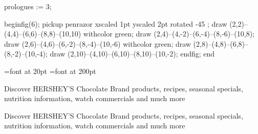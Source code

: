 \documentclass[a4paper]{report}
\begin{document}
\pagestyle{empty}
\tt %

prologues := 3;     %

beginfig(6);
pickup penrazor xscaled 1pt yscaled 2pt rotated -45 ;
draw (2,2)--(4,4)--(6,6)--(8,8)--(10,10) withcolor green;
draw (2,4)--(4,-2)--(6,-4)--(8,-6)--(10,8);
draw (2,6)--(4,6)--(6,-2)--(8,-4)--(10,-6) withcolor green;
draw (2,8)--(4,8)--(6,8)--(8,-2)--(10,-4);
draw (2,10)--(4,10)--(6,10)--(8,10)--(10,-2);
endfig;
end



\font\tiny=font at 20pt     %
\font\big=font at 200pt
\big  
\begin{flushleft}
\noindent



Discover HERSHEY'S Chocolate Brand products, recipes, seasonal \vspace{0.2}specials, nutrition information, watch commercials and much more

\tiny
Discover HERSHEY'S Chocolate Brand products, recipes, seasonal \vspace{0.2}specials, nutrition information, watch commercials and much more


\end{flushleft}
\end{document}
